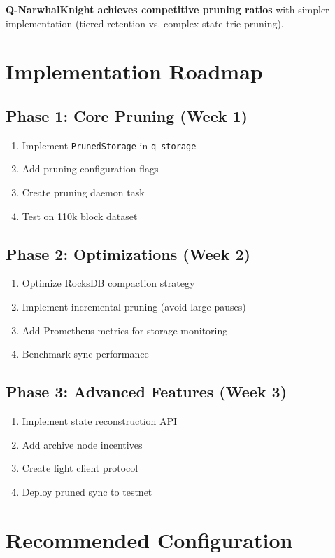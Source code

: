 \documentclass[11pt,a4paper]{article}
\begin{document}
\textbf{Q-NarwhalKnight achieves competitive pruning ratios} with simpler implementation (tiered retention vs. complex state trie pruning).

\section{Implementation Roadmap}

\subsection{Phase 1: Core Pruning (Week 1)}

\begin{enumerate}
\item Implement \texttt{PrunedStorage} in \texttt{q-storage}
\item Add pruning configuration flags
\item Create pruning daemon task
\item Test on 110k block dataset
\end{enumerate}

\subsection{Phase 2: Optimizations (Week 2)}

\begin{enumerate}
\item Optimize RocksDB compaction strategy
\item Implement incremental pruning (avoid large pauses)
\item Add Prometheus metrics for storage monitoring
\item Benchmark sync performance
\end{enumerate}

\subsection{Phase 3: Advanced Features (Week 3)}

\begin{enumerate}
\item Implement state reconstruction API
\item Add archive node incentives
\item Create light client protocol
\item Deploy pruned sync to testnet
\end{enumerate}

\section{Recommended Configuration}
\end{document}
